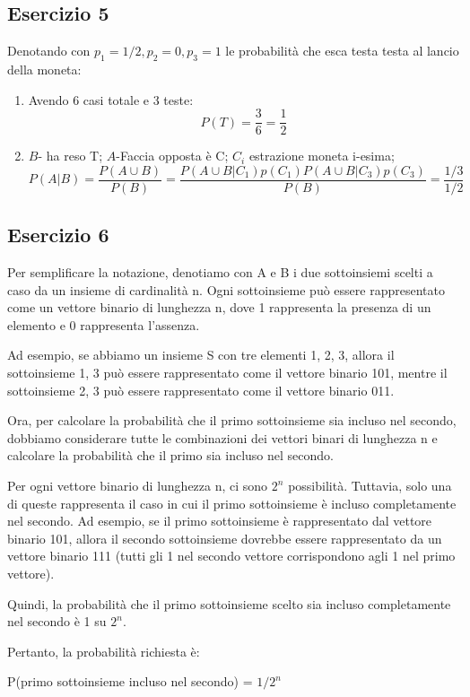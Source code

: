 \documentclass[12pt]{article}
\begin{document}
\subsection*{Esercizio 5}
Denotando con \(p_1 = 1/2,p_2 = 0,p_3 = 1\) le probabilità che esca testa testa al lancio della moneta:
\begin{enumerate}
    \item Avendo 6 casi totale e 3 teste:
    \[
    P(T) = \frac{3}{6} = \frac{1}{2}    
    \]
    \item \(B\)- ha reso T; \(A\)-Faccia opposta è C; \(C_i\) estrazione moneta i-esima;
    \[
    P(A|B) = \frac{P(A\cup B)}{P(B)} = \frac{P(A \cup B | C_1)p(C_1) P(A \cup B | C_3)p(C_3) }{P(B)} = \frac{1/3}{1/2}    
    \]
\end{enumerate}
\subsection*{Esercizio 6}

Per semplificare la notazione, denotiamo con A e B i due sottoinsiemi scelti a caso da un insieme di cardinalità n. Ogni sottoinsieme può essere rappresentato come un vettore binario di lunghezza n, dove 1 rappresenta la presenza di un elemento e 0 rappresenta l'assenza.

Ad esempio, se abbiamo un insieme S con tre elementi {1, 2, 3}, allora il sottoinsieme {1, 3} può essere rappresentato come il vettore binario 101, mentre il sottoinsieme {2, 3} può essere rappresentato come il vettore binario 011.

Ora, per calcolare la probabilità che il primo sottoinsieme sia incluso nel secondo, dobbiamo considerare tutte le combinazioni dei vettori binari di lunghezza n e calcolare la probabilità che il primo sia incluso nel secondo.

Per ogni vettore binario di lunghezza n, ci sono \(2^n\) possibilità. Tuttavia, solo una di queste rappresenta il caso in cui il primo sottoinsieme è incluso completamente nel secondo. Ad esempio, se il primo sottoinsieme è rappresentato dal vettore binario 101, allora il secondo sottoinsieme dovrebbe essere rappresentato da un vettore binario 111 (tutti gli 1 nel secondo vettore corrispondono agli 1 nel primo vettore).

Quindi, la probabilità che il primo sottoinsieme scelto sia incluso completamente nel secondo è 1 su \(2^n\).

Pertanto, la probabilità richiesta è:

P(primo sottoinsieme incluso nel secondo) = \(1 / 2^n\)
\end{document}
